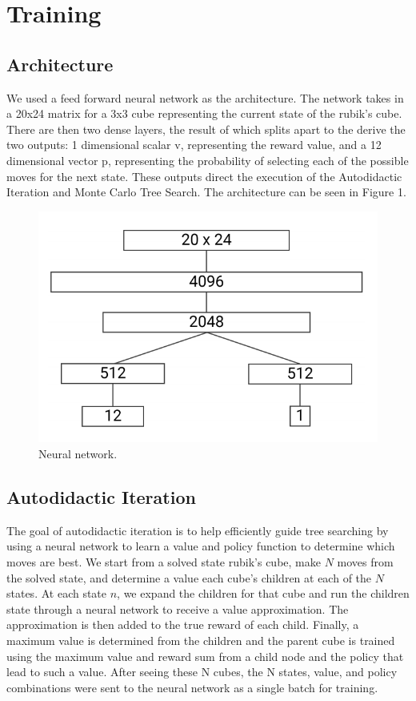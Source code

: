\documentclass[10pt,twocolumn,letterpaper]{article}
\begin{document}
\section{Training}

\subsection{Architecture}
We used a feed forward neural network as the architecture.  The network takes in a 20x24 matrix for a 3x3 cube  representing the current state of the rubik's cube.  There are then two dense layers, the result of which splits apart to the derive the two outputs: 1 dimensional scalar v, representing the reward value, and a 12 dimensional vector p, representing the probability of selecting each of the possible moves for the next state.  These outputs direct the execution of the Autodidactic Iteration and Monte Carlo Tree Search. The architecture can be seen in Figure 1.

\begin{figure}
  \includegraphics[width=\linewidth]{net.png}
  \caption{Neural network.}
  \label{fig:net}
\end{figure}

\subsection{Autodidactic Iteration}
The goal of autodidactic iteration is to help efficiently guide tree searching by using a neural network to learn a value and policy function to determine which moves are best. We start from a solved state rubik's cube, make $N$ moves from the solved state, and determine a value each cube's children at each of the $N$ states. At each state $n$, we expand the children for that cube and run the children state through a neural network to receive a value approximation. The approximation is then added to the true reward of each child. Finally, a maximum value is determined from the children and the parent cube is trained using the maximum value and reward sum from a child node and the policy that lead to such a value. After seeing these N cubes, the N states, value, and policy combinations were sent to the neural network as a single batch for training.
\\
\end{document}
